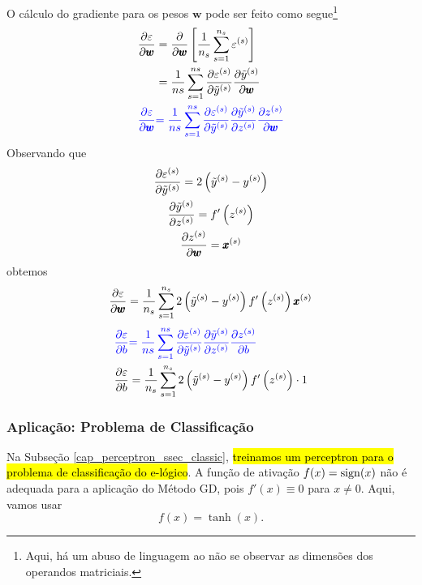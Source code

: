 O cálculo do gradiente para os pesos $\pmb{w}$ pode ser feito como segue\footnote{Aqui, há um abuso de linguagem ao não se observar as dimensões dos operandos matriciais.}
\begin{align}
  \frac{\partial\varepsilon}{\partial \pmb{w}} &= \frac{\partial}{\partial\pmb{w}}\left[\frac{1}{n_s}\sum_{s=1}^{n_s}\varepsilon^{(s)}\right]\\
                                   &= \frac{1}{ns}\sum_{s=1}^{ns}\frac{\partial\varepsilon^{(s)}}{\partial\tilde{y}^{(s)}}\frac{\partial\tilde{y}^{(s)}}{\partial\pmb{w}}\\
  {\color{blue}\frac{\partial\varepsilon}{\partial \pmb{w}}} &{\color{blue}= \frac{1}{ns}\sum_{s=1}^{ns}\frac{\partial\varepsilon^{(s)}}{\partial\tilde{y}^{(s)}}\frac{\partial\tilde{y}^{(s)}}{\partial z^{(s)}}\frac{\partial z^{(s)}}{\partial\pmb{w}}}
\end{align}
Observando que
\begin{gather}
  \frac{\partial\varepsilon^{(s)}}{\partial\tilde{y}^{(s)}} = 2\left(\tilde{y}^{(s)} - y^{(s)}\right)\\
  \frac{\partial\tilde{y}^{(s)}}{\partial z^{(s)}} = f'\left(z^{(s)}\right)\\
  \frac{\partial z^{(s)}}{\partial\pmb{w}} = \pmb{x}^{(s)}
\end{gather}
obtemos
\begin{equation}
  \frac{\partial\varepsilon}{\partial \pmb{w}} = \frac{1}{n_s}\sum_{s=1}^{n_s}2\left(\tilde{y}^{(s)}-y^{(s)}\right)f'\left(z^{(s)}\right)\pmb{x}^{(s)}
\end{equation}
\begin{align}
  {\color{blue}\frac{\partial\varepsilon}{\partial b}} &{\color{blue}= \frac{1}{ns}\sum_{s=1}^{ns}\frac{\partial\varepsilon^{(s)}}{\partial\tilde{y}^{(s)}}\frac{\partial\tilde{y}^{(s)}}{\partial z^{(s)}}\frac{\partial z^{(s)}}{\partial b}}\\
  \frac{\partial\varepsilon}{\partial b} &= \frac{1}{n_s}\sum_{s=1}^{n_s}2\left(\tilde{y}^{(s)}-y^{(s)}\right)f'\left(z^{(s)}\right)\cdot 1
\end{align}

\subsubsection{Aplicação: Problema de Classificação}

Na Subseção \ref{cap_perceptron_ssec_classic}, \hl{treinamos um perceptron para o problema de classificação do e-lógico}. A função de ativação $f(x) = \operatorname{sign}(x)$ não é adequada para a aplicação do Método GD, pois $f'(x) \equiv 0$ para $x\neq 0$. Aqui, vamos usar
\begin{equation}
  f(x) = \tanh(x).
\end{equation}

